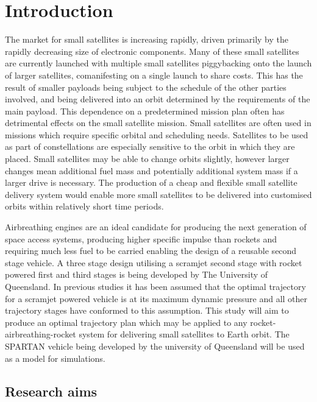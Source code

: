 
\cleardoublepage
\chapter{Introduction}

  
  
  The market for small satellites is increasing rapidly, driven primarily by the rapidly decreasing size of electronic components. Many of these small satellites are currently launched with multiple small satellites piggybacking onto the launch of larger satellites, comanifesting on a single launch to share costs. This has the result
  of smaller payloads being subject to the schedule of the other parties involved, and being delivered into
  an orbit determined by the requirements of the main payload. This dependence on a predetermined mission plan often has detrimental effects on the small satellite mission. Small satellites are often used in missions which require specific orbital and scheduling needs. Satellites to be used as part of constellations are especially sensitive to the orbit in which they are placed. Small satellites may be able to change orbits slightly, however larger changes mean additional fuel mass and potentially additional system mass if a larger drive is necessary. 
  The production of a cheap and flexible small satellite delivery system would enable more small satellites to be delivered into customised orbits within relatively short time periods.
  
  Airbreathing engines are an ideal candidate for producing the next generation of space access
  systems, producing higher specific impulse than rockets and requiring much less fuel to be carried
  enabling the design of a reusable second stage vehicle. A three stage design utilising a scramjet
  second stage with rocket powered first and third stages is being developed by The University of
  Queensland. In previous studies it has been assumed that the optimal trajectory for a scramjet powered vehicle is at its
  maximum dynamic pressure and all other trajectory stages have conformed to this assumption. This study will aim to produce an optimal
  trajectory plan which may be applied to any rocket-airbreathing-rocket system for delivering small
  satellites to Earth orbit. The SPARTAN vehicle being developed by the university of Queensland will
  be used as a model for simulations.
  
  \section{Research aims}

